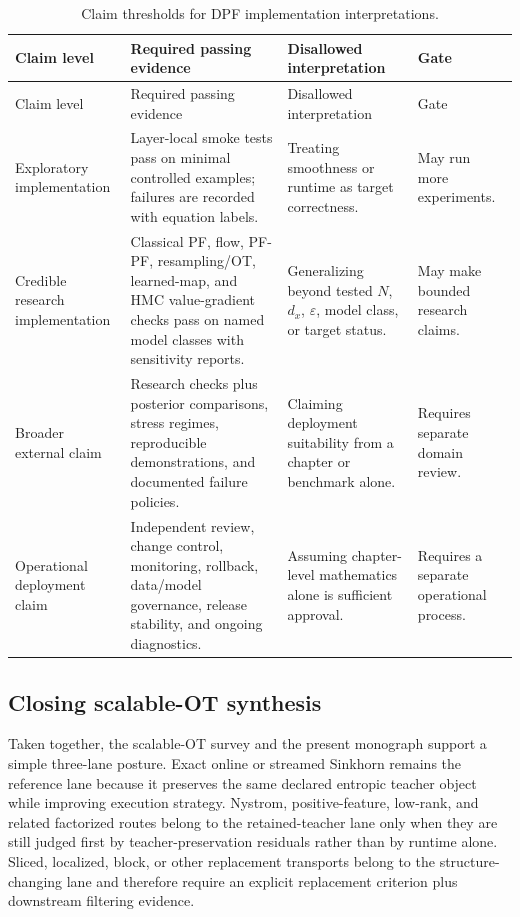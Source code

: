 \begin{longtable}{@{}p{} p{} p{} p{}@{}}
\caption{Claim thresholds for DPF implementation interpretations.}
\label{tab:bf-dpf-debug-promotion-thresholds}\\
\toprule
Claim level & Required passing evidence & Disallowed interpretation & Gate \\
\midrule
\endfirsthead
\toprule
Claim level & Required passing evidence & Disallowed interpretation & Gate \\
\midrule
\endhead
Exploratory implementation &
Layer-local smoke tests pass on minimal controlled examples; failures are
recorded with equation labels. &
Treating smoothness or runtime as target correctness. &
May run more experiments. \\
Credible research implementation &
Classical PF, flow, PF-PF, resampling/OT, learned-map, and HMC value-gradient
checks pass on named model classes with sensitivity reports. &
Generalizing beyond tested $N$, $d_x$, $\varepsilon$, model class, or target
status. &
May make bounded research claims. \\
Broader external claim &
Research checks plus posterior comparisons, stress regimes, reproducible
demonstrations, and documented failure policies. &
Claiming deployment suitability from a chapter or benchmark alone. &
Requires separate domain review. \\
Operational deployment claim &
Independent review, change control, monitoring, rollback, data/model
governance, release stability, and ongoing diagnostics. &
Assuming chapter-level mathematics alone is sufficient approval. &
Requires a separate operational process. \\
\bottomrule
\end{longtable}

\subsection{Closing scalable-OT synthesis}
\label{sec:bf-dpf-debug-scalable-ot-synthesis}

Taken together, the scalable-OT survey and the present monograph support a simple
three-lane posture.  Exact online or streamed Sinkhorn remains the reference lane
because it preserves the same declared entropic teacher object while improving
execution strategy.  Nystrom, positive-feature, low-rank, and related factorized
routes belong to the retained-teacher lane only when they are still judged first
by teacher-preservation residuals rather than by runtime alone.  Sliced,
localized, block, or other replacement transports belong to the structure-changing
lane and therefore require an explicit replacement criterion plus downstream
filtering evidence.

